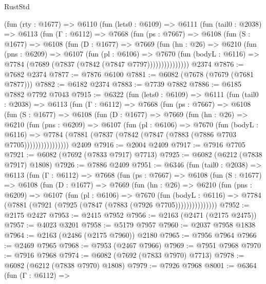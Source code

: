 \begin{lexlean}{RustStd}
\begin{coremodule}
    (fun (rty : @1677) =>
    @6110
      (fun (lets0 : @6109) =>
      @6111
        (fun (tail0 : @2038) =>
        @6113
          (fun (Γ : @6112) =>
          @7668
            (fun (ps : @7667) =>
            @6108
              (fun (S : @1677) =>
              @6108
                (fun (D : @1677) =>
                @7669
                  (fun (hn : @26) =>
                  @6210
                    (fun (pns : @6209) =>
                    @6107
                      (fun (pl : @6106) =>
                      @7670
                        (fun (bodyL : @6116) =>
                        @7784 (@7689 (@7837 (@7842 (@7847 @7797)))))))))))))))
    @2374
@7876 := @7682 @2374
@7877 := @7876 @6100
@7881 := @6082 (@7678 (@7679 (@7681 @7877)))
@7882 := @6182 @2374
@7883 := @7739 @7882
@7886 := @6185 @7882 @7792 @7043
@7915 := @6322
    (fun (lets0 : @6109) =>
    @6111
      (fun (tail0 : @2038) =>
      @6113
        (fun (Γ : @6112) =>
        @7668
          (fun (ps : @7667) =>
          @6108
            (fun (S : @1677) =>
            @6108
              (fun (D : @1677) =>
              @7669
                (fun (hn : @26) =>
                @6210
                  (fun (pns : @6209) =>
                  @6107
                    (fun (pl : @6106) =>
                    @7670
                      (fun (bodyL : @6116) =>
                      @7784 (@7881 (@7837 (@7842 (@7847 (@7883 (@7886 @7703 @7705))))))))))))))))
    @2409
@7916 := @2004 @2409
@7917 := @7916 @7705
@7921 := @6082 (@7692 (@7833 @7917) @7713)
@7925 := @6082 (@6212 (@7838 @7917) @1808)
@7926 := @7886 @2409
@7951 := @6346
    (fun (tail0 : @2038) =>
    @6113
      (fun (Γ : @6112) =>
      @7668
        (fun (ps : @7667) =>
        @6108
          (fun (S : @1677) =>
          @6108
            (fun (D : @1677) =>
            @7669
              (fun (hn : @26) =>
              @6210
                (fun (pns : @6209) =>
                @6107
                  (fun (pl : @6106) =>
                  @7670
                    (fun (bodyL : @6116) =>
                    @7784 (@7881 (@7921 (@7925 (@7847 (@7883 (@7926 @7705)))))))))))))))
@7952 := @2175 @2427
@7953 := @2415 @7952
@7956 := @2163 (@2471 (@2175 @2475))
@7957 := @4023 @3201
@7958 := @5179 @7957
@7960 := @2037 @7958 @1838
@7964 := @2163 (@2486 (@2175 @7960)) @2180
@7965 := @7956 @7964
@7966 := @2469 @7965
@7968 := @7953 (@2467 @7966)
@7969 := @7951 @7968
@7970 := @7916 @7968
@7974 := @6082 (@7692 (@7833 @7970) @7713)
@7978 := @6082 (@6212 (@7838 @7970) @1808)
@7979 := @7926 @7968
@8001 := @6364
    (fun (Γ : @6112) =>

\end{coremodule}
\end{lexlean}
